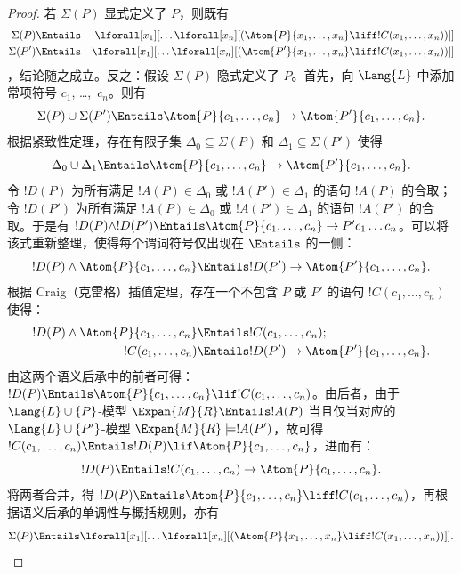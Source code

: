 \documentclass[../../../include/open-logic-section]{subfiles}
\begin{document}
\begin{proof}
若 $\Sigma(P)$ 显式定义了 $P$，则既有 \begin{align*}
  \Sigma(P) & \Entails & \lforall[x_1][\dots \lforall[x_n]
    [(\Atom{P}{x_1,\dots, x_n} \liff !C(x_1,\dots,x_n))]]\\
  \Sigma(P') & \Entails & \lforall[x_1][\dots \lforall[x_n]
    [(\Atom{P'}{x_1,\dots, x_n} \liff !C(x_1,\dots,x_n))]]
\end{align*}，结论随之成立。反之：假设 $\Sigma(P)$ 隐式定义了 $P$。首先，向 $\Lang{L}$ 中添加常项符号 $c_1$, \dots,~$c_n$。则有
\[
\Sigma(P) \cup \Sigma(P') \Entails
\Atom{P}{c_1, \dots, c_n} \to  \Atom{P'}{c_1, \dots, c_n}.
\]
根据紧致性定理，存在有限子集 $\Delta_0 \subseteq \Sigma(P)$ 和 $\Delta_1 \subseteq \Sigma(P')$ 使得
\[
\Delta_0 \cup \Delta_1 \Entails
\Atom{P}{c_1, \dots, c_n} \to \Atom{P'}{c_1, \dots, c_n}.
\]
令 $!D(P)$ 为所有满足 $!A(P) \in \Delta_0$ 或 $!A(P') \in \Delta_1$ 的语句 $!A(P)$ 的合取；令 $!D(P')$ 为所有满足 $!A(P) \in \Delta_0$ 或 $!A(P') \in \Delta_1$ 的语句 $!A(P')$ 的合取。于是有 $!D(P) \land
!D(P') \Entails \Atom{P}{c_1, \dots, c_n} \to P'c_1\dots c_n$。可以将该式重新整理，使得每个谓词符号仅出现在 $\Entails$ 的一侧：
\[
!D(P) \land \Atom{P}{c_1, \dots, c_n} \Entails
!D(P') \to \Atom{P'}{c_1, \dots, c_n}.
\]
根据 Craig（克雷格）插值定理，存在一个不包含 $P$ 或 $P'$ 的语句 $!C(c_1,\dots, c_n)$ 使得：
\begin{align*}
  !D(P) \land \Atom{P}{c_1, \dots, c_n} & \Entails !C(c_1,\dots, c_n); \\
  !C(c_1,\dots, c_n) & \Entails !D(P') \to \Atom{P'}{c_1, \dots, c_n}.
\end{align*}
由这两个语义后承中的前者可得：$!D(P) \Entails
\Atom{P}{c_1,\dots, c_n} \lif !C(c_1,\dots, c_n)$。由后者，由于 $\Lang{L} \cup \{P\}$-模型 $\Expan{M}{R}
\Entails !A(P)$ 当且仅当对应的 $\Lang{L} \cup
\{P'\}$-模型 $\Expan{M}{R} \models !A(P')$，故可得 $!C(c_1,\dots, c_n) \Entails !D(P) \lif \Atom{P}{c_1,\dots, c_n}$，进而有：
\[
!D(P) \Entails !C(c_1,\dots,c_n) \to \Atom{P}{c_1,\dots, c_n}.
\]
将两者合并，得 $!D(P) \Entails \Atom{P}{c_1,\dots, c_n}
\liff !C(c_1, \dots, c_n)$，再根据语义后承的单调性与概括规则，亦有
\[
\Sigma(P) \Entails
\lforall[x_1][\dots\lforall[x_n][(\Atom{P}{x_1,\dots, x_n} \liff
    !C(x_1,\dots, x_n))]].
\]
\end{proof}
\end{document}
